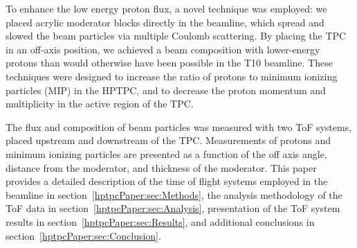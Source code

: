 To enhance the low energy proton flux, a novel technique was employed:
we placed acrylic moderator blocks directly in the beamline, which spread and slowed the beam particles via multiple Coulomb scattering.
By placing the TPC in an off-axis position, we achieved a beam composition with lower-energy protons than would otherwise have been possible in the T10 beamline.
These techniques were designed to increase the ratio of protons to minimum ionizing particles (MIP) in the HPTPC, and to decrease the proton momentum and multiplicity in the active region of the TPC.

The flux and composition of beam particles was measured with two ToF systems, placed upstream and downstream of the TPC.
Measurements of protons and minimum ionizing particles are presented as a function of the off axis angle, distance from the moderator, and thickness of the moderator.
This paper provides a detailed description of the time of flight systems employed in the beamline in section~\ref{hptpcPaper:sec:Methods}, the analysis methodology of the ToF data in section~\ref{hptpcPaper:sec:Analysis}, presentation of the ToF system results in section~\ref{hptpcPaper:sec:Results}, and additional conclusions in section~\ref{hptpcPaper:sec:Conclusion}.
